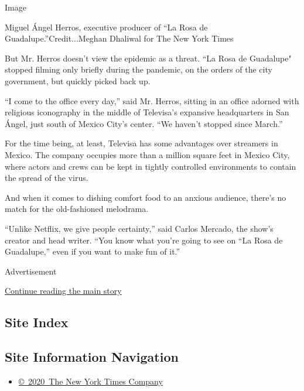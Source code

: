 Image

Miguel Ángel Herros, executive producer of ``La Rosa de
Guadalupe.''Credit...Meghan Dhaliwal for The New York Times

But Mr. Herros doesn't view the epidemic as a threat. ``La Rosa de
Guadalupe" stopped filming only briefly during the pandemic, on the
orders of the city government, but quickly picked back up.

``I come to the office every day,'' said Mr. Herros, sitting in an
office adorned with religious iconography in the middle of Televisa's
expansive headquarters in San Ángel, just south of Mexico City's center.
``We haven't stopped since March.''

For the time being, at least, Televisa has some advantages over
streamers in Mexico. The company occupies more than a million square
feet in Mexico City, where actors and crews can be kept in tightly
controlled environments to contain the spread of the virus.

And when it comes to dishing comfort food to an anxious audience,
there's no match for the old-fashioned melodrama.

``Unlike Netflix, we give people certainty,'' said Carlos Mercado, the
show's creator and head writer. ``You know what you're going to see on
``La Rosa de Guadalupe,'' even if you want to make fun of it.''

Advertisement

\protect\hyperlink{after-bottom}{Continue reading the main story}

\hypertarget{site-index}{%
\subsection{Site Index}\label{site-index}}

\hypertarget{site-information-navigation}{%
\subsection{Site Information
Navigation}\label{site-information-navigation}}

\begin{itemize}
\tightlist
\item
  \href{https://help.nytimes.com/hc/en-us/articles/115014792127-Copyright-notice}{©~2020~The
  New York Times Company}
\end{itemize}

